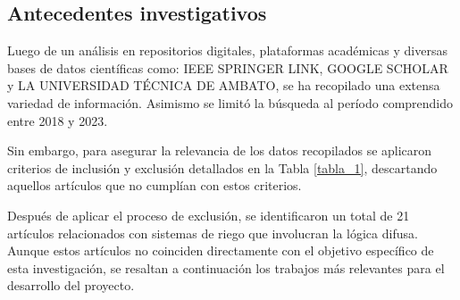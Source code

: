 \subsection{Antecedentes investigativos}
Luego de un análisis en repositorios digitales, plataformas académicas y
diversas bases de datos científicas como: IEEE SPRINGER LINK, GOOGLE SCHOLAR y
LA UNIVERSIDAD TÉCNICA DE AMBATO, se ha recopilado una extensa variedad de
información. Asimismo se limitó la búsqueda al período comprendido entre 2018 y
2023.

\bigbreak
Sin embargo, para asegurar la relevancia de los datos recopilados se
aplicaron criterios de inclusión y exclusión detallados en la Tabla
\ref{tabla_1}, descartando aquellos artículos que no cumplían con estos
criterios.



Después de aplicar el proceso de exclusión, se identificaron un total de 21
artículos relacionados con sistemas de riego que involucran la lógica difusa.
Aunque estos artículos no coinciden directamente con el objetivo específico de
esta investigación, se resaltan a continuación los trabajos más relevantes para
el desarrollo del proyecto.

